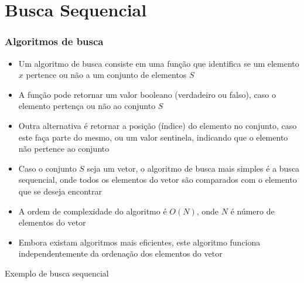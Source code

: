 \section{Busca Sequencial}

\begin{frame}[fragile]\frametitle{Algoritmos de busca}

	\begin{itemize}
        \item Um algoritmo de busca consiste em uma função que identifica se um elemento $x$
        pertence ou não a um conjunto de elementos $S$

        \item A função pode retornar um valor booleano (verdadeiro ou falso), caso o elemento 
        pertença ou não ao conjunto $S$

        \item Outra alternativa é retornar a posição (índice) do elemento no conjunto, caso
        este faça parte do mesmo, ou um valor sentinela, indicando que o elemento não 
        pertence ao conjunto

		\item Caso o conjunto $S$ seja um vetor, o algoritmo de busca mais simples é a busca 
        sequencial, onde todos os elementos do vetor são comparados com o elemento que se deseja 
        encontrar

		\item A ordem de complexidade do algoritmo é $O(N)$, onde $N$ é número de elementos do vetor

		\item Embora existam algoritmos mais eficientes, este algoritmo funciona independentemente
        da ordenação dos elementos do vetor
	\end{itemize}
 
\end{frame}  

\begin{frame}[fragile]{Exemplo de busca sequencial}


\end{frame}

